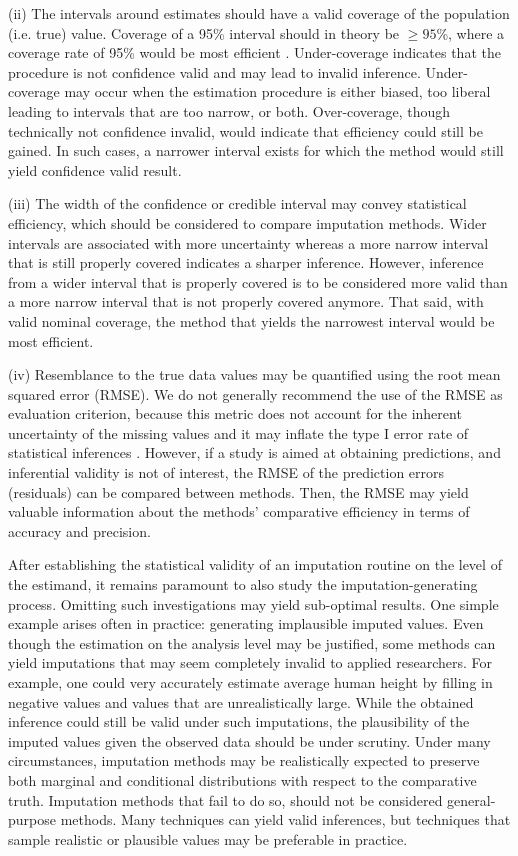 \documentclass[bimj,fleqn]{w-art}
\begin{document}
(ii) The intervals around estimates should have a valid coverage of the population (i.e. true) value. Coverage of a 95\% interval should in theory be $\geq 95$\%, where a coverage rate of 95\% would be most efficient \citep[p. 589]{neym34}. Under-coverage indicates that the procedure is not confidence valid and may lead to invalid inference. Under-coverage may occur when the estimation procedure is either biased, too liberal leading to intervals that are too narrow, or both. Over-coverage, though technically not confidence invalid, would indicate that efficiency could still be gained. In such cases, a narrower interval exists for which the method would still yield confidence valid result. 

(iii) The width of the confidence or credible interval may convey statistical efficiency, which should be considered to compare imputation methods. Wider intervals are associated with more uncertainty whereas a more narrow interval that is still properly covered indicates a sharper inference. However, inference from a wider interval that is properly covered is to be considered more valid than a more narrow interval that is not properly covered anymore. That said, with valid nominal coverage, the method that yields the narrowest interval would be most efficient. 

(iv) Resemblance to the true data values may be quantified using the root mean squared error (RMSE). We do not generally recommend the use of the RMSE as evaluation criterion, because this metric does not account for the inherent uncertainty of the missing values and it may inflate the type I error rate of statistical inferences \citep[Chapter 2.6][]{buur18}. However, if a study is aimed at obtaining predictions, and inferential validity is not of interest, the RMSE of the prediction errors (residuals) can be compared between methods. Then, the RMSE may yield valuable information about the methods' comparative efficiency in terms of accuracy and precision. 

After establishing the statistical validity of an imputation routine on the level of the estimand, it remains paramount to also study the imputation-generating process. Omitting such investigations may yield sub-optimal results. One simple example arises often in practice: generating implausible imputed values. Even though the estimation on the analysis level may be justified, some methods can yield imputations that may seem completely invalid to applied researchers. For example, one could very accurately estimate average human height by filling in negative values and values that are unrealistically large. While the obtained inference could still be valid under such imputations, the plausibility of the imputed values given the observed data should be under scrutiny. Under many circumstances, imputation methods may be realistically expected to preserve both marginal and conditional distributions with respect to the comparative truth. Imputation methods that fail to do so, should not be considered general-purpose methods. Many techniques can yield valid inferences, but techniques that sample realistic or plausible values may be preferable in practice. 
\end{document}

